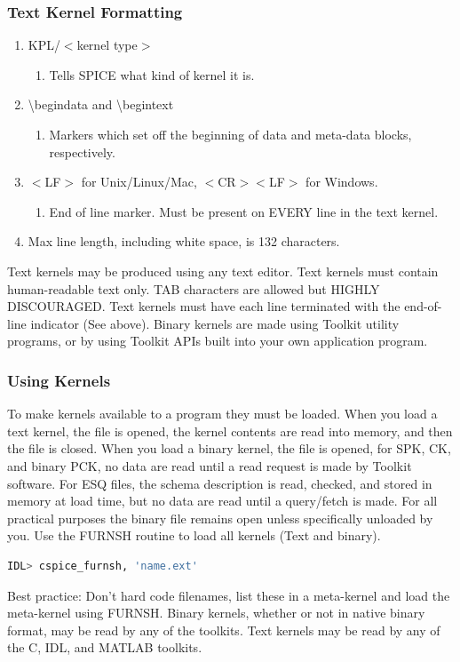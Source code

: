 \documentclass[crop=false,class=book]{standalone}
\begin{document}
\subsubsection*{Text Kernel Formatting}
\begin{enumerate}
    \item[]KPL/$<$kernel type$>$
    \begin{enumerate}
        \item[] Tells SPICE what kind of kernel it is.
    \end{enumerate}
    \item[] \textbackslash begindata and \textbackslash begintext
    \begin{enumerate}
        \item[] Markers which set off the beginning of data and meta-data blocks, respectively.
    \end{enumerate}
    \item[] $<$LF$>$ for Unix/Linux/Mac, $<$CR$><$LF$>$ for Windows.
    \begin{enumerate}
        \item[] End of line marker. Must be present on EVERY line in the text kernel.
    \end{enumerate}
    \item[] Max line length, including white space, is 132 characters.
\end{enumerate}
Text kernels may be produced using any text editor. Text kernels must contain human-readable text only. TAB characters are allowed but HIGHLY DISCOURAGED. Text kernels must have each line terminated with the end-of-line indicator (See above). Binary kernels are made using Toolkit utility programs, or by using Toolkit APIs built into your own application program.
\subsubsection{Using Kernels}
To make kernels available to a program they must be loaded. When you load a text kernel, the file is opened, the kernel contents are read into memory, and then the file is closed. When you load a binary kernel, the file is opened, for SPK, CK, and binary PCK, no data are read until a read request is made by Toolkit software. For ESQ files, the schema description is read, checked, and stored in memory at load time, but no data are read until a query/fetch is made. For all practical purposes the binary file remains open unless specifically unloaded by you. Use the FURNSH routine to load all kernels (Text and binary).
\begin{lstlisting}[language=bash,basicstyle=\footnotesize]
IDL> cspice_furnsh, 'name.ext'
\end{lstlisting}
Best practice: Don't hard code filenames, list these in a meta-kernel and load the meta-kernel using FURNSH. Binary kernels, whether or not in native binary format, may be read by any of the toolkits. Text kernels may be read by any of the C, IDL, and MATLAB toolkits.
\end{document}

